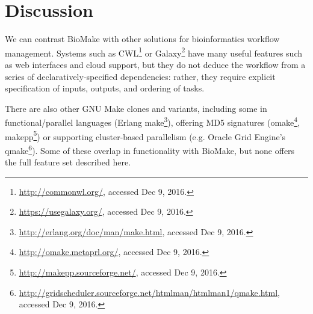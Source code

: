 \documentclass{bioinfo}
\newcommand\Makefile{{\tt Makefile}}
\newcommand\biomake{{\tt biomake}}
\newcommand\footurl[1]{\footnote{\url{#1}, accessed Dec 9, 2016.}}
\begin{document}
% 
% 
% 

\section*{Discussion}

We can contrast BioMake with other solutions for bioinformatics workflow management.
Systems such as CWL\footurl{http://commonwl.org/} or Galaxy\footurl{https://usegalaxy.org/} have many useful features such as web interfaces and cloud support,
but they do not deduce the workflow from a series of declaratively-specified dependencies: rather, they require explicit specification of inputs, outputs, and ordering of tasks.

There are also other GNU Make clones and variants, including some in functional/parallel languages (Erlang make\footurl{http://erlang.org/doc/man/make.html}),
offering MD5 signatures (omake\footurl{http://omake.metaprl.org/}, makepp\footurl{http://makepp.sourceforge.net/})
or supporting cluster-based parallelism (e.g. Oracle Grid Engine's qmake\footurl{http://gridscheduler.sourceforge.net/htmlman/htmlman1/qmake.html}).
Some of these overlap in functionality with BioMake, but none offers the full feature set described here.
\end{document}
